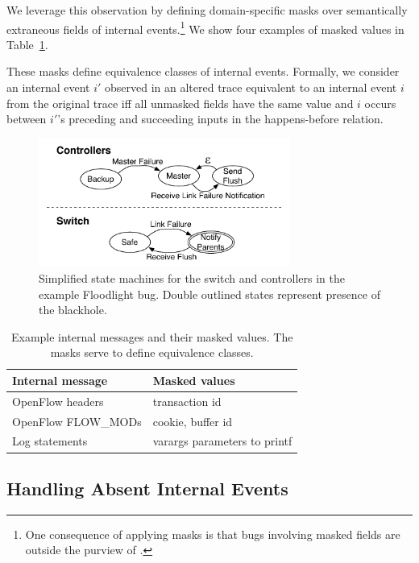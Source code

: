 We leverage this observation by defining
domain-specific masks over semantically extraneous fields of
internal events.\footnote{One consequence
of applying masks is that bugs involving masked fields are outside the purview of
\simulator.} We show four examples of masked values
in Table~\ref{tab:fingerprints}.

These masks define equivalence classes
of internal events. Formally, we consider an internal event $i'$ observed in an altered trace
equivalent to an internal event $i$ from the original trace iff all unmasked
fields have the same value
and $i$ occurs between $i'$'s preceding and succeeding inputs in the
happens-before relation.

\begin{figure}[t]
    \includegraphics[width=3.25in]{../diagrams/state_machines/controller_switch.pdf}
    \caption[]{\label{fig:state_machines} Simplified state machines for the switch and
    controllers in the example Floodlight bug. Double outlined states
    represent presence of the blackhole.}
\end{figure}

\begin{table}
\centering
\begin{tabular}{|l|l|}
\hline
Internal message & Masked values \\
\hline
OpenFlow headers & transaction id\\
OpenFlow FLOW\_MODs & cookie, buffer id \\
Log statements & varargs parameters to printf \\
\hline
\end{tabular}
\caption{Example internal messages and their masked values. The masks serve to
define equivalence classes.}
\label{tab:fingerprints}
\end{table}

\subsection{Handling Absent Internal Events}
\label{subsec:divergence}

